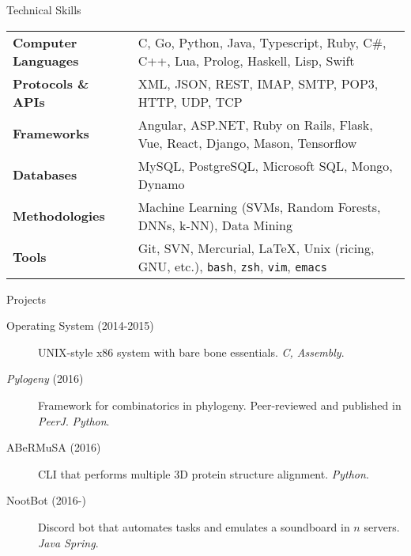 \documentclass{resume} %
\begin{document}
\begin{rSection}{Technical Skills}

\begin{tabular}{ @{} >{\bfseries}l @{\hspace{1ex}} l }
Computer Languages & C, Go, Python, Java, Typescript, Ruby, C\#, C++, Lua, Prolog, Haskell, Lisp, Swift \\
Protocols \& APIs & XML, JSON, REST, IMAP, SMTP, POP3, HTTP, UDP, TCP \\
Frameworks & Angular, ASP.NET, Ruby on Rails, Flask, Vue, React, Django, Mason, Tensorflow \\ 
Databases & MySQL, PostgreSQL, Microsoft SQL, Mongo, Dynamo \\
Methodologies & Machine Learning (SVMs, Random Forests, DNNs, k-NN), Data Mining \\
Tools & Git, SVN, Mercurial, \LaTeX, Unix (ricing, GNU, etc.), \texttt{bash}, \texttt{zsh}, \texttt{vim}, \texttt{emacs}
\end{tabular}

\end{rSection}


\begin{rSection}{Projects}

\begin{description}
\item [Operating System (2014-2015)] UNIX-style x86 system with bare bone essentials. \textit{C, Assembly}.
\item [\textit{Pylogeny} (2016)] Framework for combinatorics in phylogeny. Peer-reviewed and published in \textit{PeerJ}. \textit{Python}.
\item [ABeRMuSA (2016)] CLI that performs multiple 3D protein structure alignment. \textit{Python}.
\item [NootBot (2016-)] Discord bot that automates tasks and emulates a soundboard in $n$ servers. \textit{Java Spring}.
\end{description}

\end{rSection}

\end{document}
